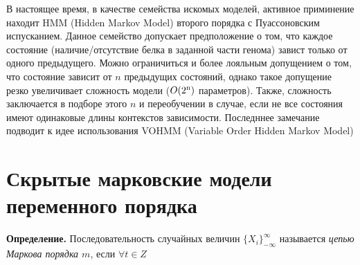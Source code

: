 \documentclass[10pt,a4paper]{article}
\begin{document}
В настоящее время, в качестве семейства искомых моделей, активное приминение находит HMM (Hidden Markov Model)\cite{Rabiner1989} второго порядка с Пуассоновским испусканием.
Данное семейство допускает предположение о том, что каждое состояние (наличие/отсутствие белка в заданной части генома) завист только от одного предыдущего.
Можно ограничиться и более лояльным допущением о том, что состояние зависит от $n$ предыдущих состояний, однако такое допущение резко увеличивает сложность модели ($O(2\textsuperscript{n})$ параметров). Также, сложность заключается в подборе этого $n$ и переобучении в случае, если не все состояния имеют одинаковые длины контекстов зависимости.
Последннее замечание подводит к идее использования VOHMM (Variable Order Hidden Markov Model)\cite{Wang2006}


\section{Скрытые марковские модели переменного порядка}

\textbf{Определение.} Последовательность случайных величин $ \{X_{i}\}_{-\infty}^{\infty}$ называется \emph{цепью Маркова порядка $ m $}, если $ \forall t\in Z $
\end{document}
